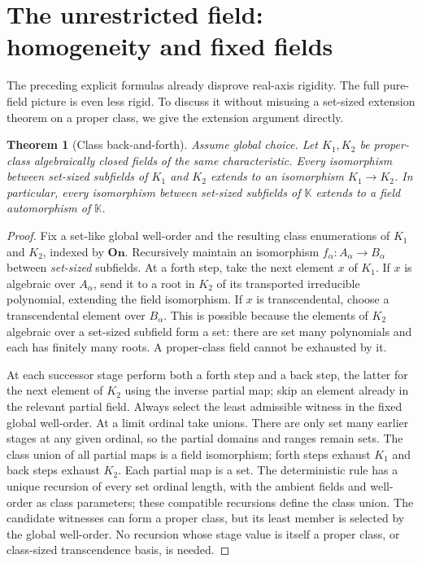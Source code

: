 \documentclass[11pt]{article}
\newtheorem{theorem}{Theorem}[section]
\theoremstyle{definition}
\theoremstyle{remark}
\newcommand{\On}{\mathbf{On}}
\newcommand{\K}{\mathbb K}
\numberwithin{equation}{section}
\begin{document}
\section{The unrestricted field: homogeneity and fixed fields}\label{saut:sec:bare}

The preceding explicit formulas already disprove real-axis rigidity.
The full pure-field picture is even less rigid. To discuss it without
misusing a set-sized extension theorem on a proper class, we give the
extension argument directly.

\begin{theorem}[Class back-and-forth]\label{saut:thm:acfhomogeneity}
Assume global choice. Let $K_1,K_2$ be proper-class algebraically closed
fields of the same characteristic. Every isomorphism between set-sized
subfields of $K_1$ and $K_2$ extends to an isomorphism $K_1\to K_2$.
In particular, every isomorphism between set-sized subfields of $\K$
extends to a field automorphism of $\K$.
\end{theorem}
\begin{proof}
Fix a set-like global well-order and the resulting class enumerations of
$K_1$ and $K_2$, indexed by $\On$.
Recursively maintain an isomorphism $f_\alpha:A_\alpha\to B_\alpha$
between \emph{set-sized} subfields. At a forth step, take the next element
$x$ of $K_1$. If $x$ is algebraic over $A_\alpha$, send it to a root in
$K_2$ of its transported irreducible polynomial, extending the field
isomorphism. If $x$ is transcendental, choose a transcendental element over
$B_\alpha$. This is possible because the elements of $K_2$ algebraic over
a set-sized subfield form a set: there are set many polynomials and each
has finitely many roots. A proper-class field cannot be exhausted by it.

At each successor stage perform both a forth step and a back step, the
latter for the next element of $K_2$ using the inverse partial map; skip an
element already in the relevant partial field. Always select the least
admissible witness in the fixed global well-order. At a limit ordinal
take unions. There are only set many
earlier stages at any given ordinal, so the partial domains and ranges
remain sets. The class union of all partial maps is a field isomorphism;
forth steps exhaust $K_1$ and back steps exhaust $K_2$.
Each partial map is a set. The deterministic rule has a unique recursion
of every set ordinal length, with the ambient fields and well-order as
class parameters; these compatible recursions define the class union.
The candidate witnesses can form a proper class, but its least member is
selected by the global well-order. No recursion whose stage value is itself
a proper class, or class-sized transcendence basis, is needed.
\end{proof}
\end{document}
